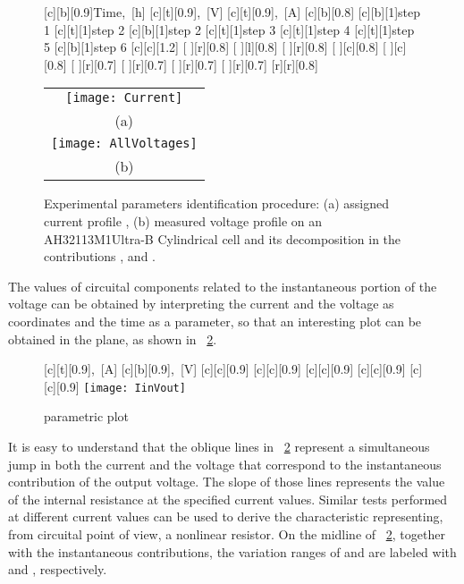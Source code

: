 \documentclass[journal]{IEEEtran}
\begin{document}
\begin{figure}[!htbp]
    [c][b][0.9]{\scriptsize{Time,~[h]}}
    [c][t][0.9]{\scriptsize{,~[V]}}
    [c][t][0.9]{\scriptsize{,~[A]}}
    [c][b][0.8]{\tiny{}}
    [c][b][1]{\tiny{step 1}}
    [c][t][1]{\tiny{step 2}}
    [c][b][1]{\tiny{step 2}}
    [c][t][1]{\tiny{step 3}}
    [c][t][1]{\tiny{step 4}}
    [c][t][1]{\tiny{step 5}}
    [c][b][1]{\tiny{step 6}}
    [c][c][1.2]{\tiny{}}
    [ ][r][0.8]{\tiny{}}
    [ ][l][0.8]{\tiny{}}
    [ ][r][0.8]{\tiny{}}
    [ ][c][0.8]{\tiny{}}
    [ ][c][0.8]{\tiny{}}
    [ ][r][0.7]{\tiny{}}
    [ ][r][0.7]{\tiny{}}
    [ ][r][0.7]{\tiny{}}
    [ ][r][0.7]{\tiny{}}
    [r][r][0.8]{\tiny{}}
	\centering
	\begin{tabular}{c}
		\texttt{[image: Current]} \\
		(a) \\
        \hspace{-0.3cm}	
		\texttt{[image: AllVoltages]} \\
		(b) \\
	\end{tabular}
	\caption{Experimental parameters identification procedure: (a) assigned current profile , (b) measured voltage profile  on an AH32113M1Ultra-B Cylindrical cell and its decomposition in the contributions ,  and .}
\label{fig::IandV}
\end{figure}
The values of circuital components related to the instantaneous portion of the voltage can be obtained by interpreting the current  and the voltage  as coordinates and the time  as a parameter, so that an interesting plot can be obtained in the  plane, as shown in \figurename~\ref{fig::IinVout}. 
\begin{figure}[!htbp]
    [c][t][0.9]{\tiny{,~[A]}}
    [c][b][0.9]{\tiny{,~[V]}}
    [c][c][0.9]{\tiny{}}
    [c][c][0.9]{\tiny{}}
    [c][c][0.9]{\tiny{}}
    [c][c][0.9]{\tiny{}}
    [c][c][0.9]{\tiny{}}
    \centering
		\texttt{[image: IinVout]}
	\caption{ parametric plot}
	\label{fig::IinVout}
\end{figure}
It is easy to understand that the oblique lines in \figurename~\ref{fig::IinVout} represent a simultaneous jump in both the current and the voltage that correspond to the instantaneous contribution of the output voltage.
The slope of those lines represents the value of the internal resistance at the specified current values. Similar tests performed at different current values can be used to derive the characteristic  representing, from  circuital point of view, a nonlinear resistor.
On the midline of \figurename~\ref{fig::IinVout}, together with the instantaneous contributions, the variation ranges of  and  are labeled with  and , respectively.
\end{document}

